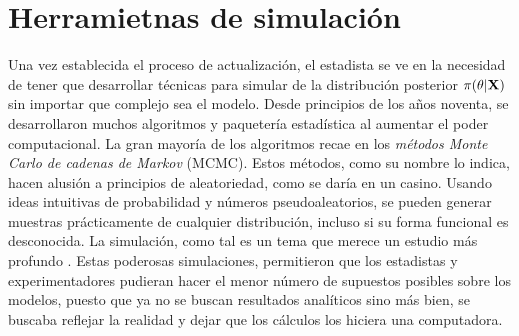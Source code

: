 \documentclass[../Main/Main.tex]{subfiles}
\begin{document}
\section{Herramietnas de simulación} \label{sec:GibbsSampler}
Una vez establecida el proceso de actualización, el estadista se ve en la necesidad de tener que desarrollar técnicas para simular de la distribución posterior $\pi(\theta|\mathbf{X})$ sin importar que complejo sea el modelo. Desde principios de los años noventa, se desarrollaron muchos algoritmos y paquetería estadística al aumentar el poder computacional.  La gran mayoría de los algoritmos recae en los \textit{métodos Monte Carlo de cadenas de Markov} (MCMC). Estos métodos, como su nombre lo indica, hacen alusión a principios de aleatoriedad, como se daría en un casino. Usando ideas intuitivas de probabilidad y números pseudoaleatorios, se pueden generar muestras prácticamente de cualquier distribución, incluso si su forma funcional es desconocida. La simulación, como tal es un tema que merece un estudio más profundo \autocite{robert2004monte}. Estas poderosas simulaciones, permitieron  que los estadistas y experimentadores pudieran hacer el menor número de supuestos posibles sobre los modelos, puesto que ya no se buscan resultados analíticos sino más bien, se buscaba reflejar la realidad y dejar que los cálculos los hiciera una computadora.
\end{document}
